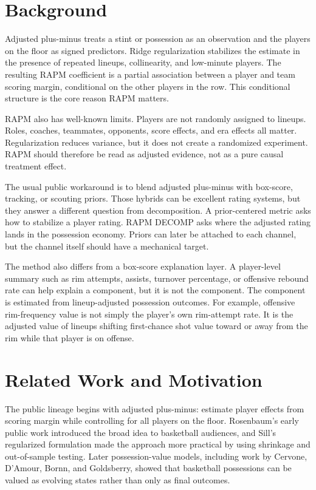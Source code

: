 \documentclass[11pt]{article}
\begin{document}
\section{Background}

Adjusted plus-minus treats a stint or possession as an observation and the
players on the floor as signed predictors.  Ridge regularization stabilizes the
estimate in the presence of repeated lineups, collinearity, and low-minute
players.  The resulting RAPM coefficient is a partial association between a
player and team scoring margin, conditional on the other players in the row.
This conditional structure is the core reason RAPM matters.

RAPM also has well-known limits.  Players are not randomly assigned to lineups.
Roles, coaches, teammates, opponents, score effects, and era effects all matter.
Regularization reduces variance, but it does not create a randomized
experiment.  RAPM should therefore be read as adjusted evidence, not as a pure
causal treatment effect.

The usual public workaround is to blend adjusted plus-minus with box-score,
tracking, or scouting priors.  Those hybrids can be excellent rating systems,
but they answer a different question from decomposition.  A prior-centered
metric asks how to stabilize a player rating.  RAPM DECOMP asks where the
adjusted rating lands in the possession economy.  Priors can later be attached
to each channel, but the channel itself should have a mechanical target.

The method also differs from a box-score explanation layer.  A player-level
summary such as rim attempts, assists, turnover percentage, or offensive
rebound rate can help explain a component, but it is not the component.  The
component is estimated from lineup-adjusted possession outcomes.  For example,
offensive rim-frequency value is not simply the player's own rim-attempt rate.
It is the adjusted value of lineups shifting first-chance shot value toward or
away from the rim while that player is on offense.

\section{Related Work and Motivation}

The public lineage begins with adjusted plus-minus: estimate player effects from
scoring margin while controlling for all players on the floor.  Rosenbaum's
early public work introduced the broad idea to basketball audiences, and Sill's
regularized formulation made the approach more practical by using shrinkage and
out-of-sample testing.  Later possession-value models, including work by
Cervone, D'Amour, Bornn, and Goldsberry, showed that basketball possessions can
be valued as evolving states rather than only as final outcomes.
\end{document}
